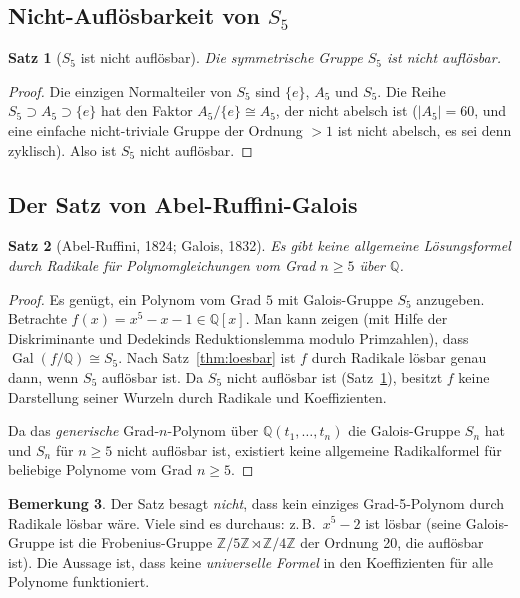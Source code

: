 \documentclass[12pt,a4paper]{amsart}
\newtheorem{theorem}{Satz}[section]
\theoremstyle{definition}
\newtheorem{bemerkung}[theorem]{Bemerkung}
\newcommand{\Q}{\mathbb{Q}}
\newcommand{\Z}{\mathbb{Z}}
\newcommand{\Gal}{\operatorname{Gal}}
\begin{document}
\subsection{Nicht-Auflösbarkeit von $S_5$}

\begin{theorem}[$S_5$ ist nicht auflösbar]
\label{thm:s5nichtloesbar}
Die symmetrische Gruppe $S_5$ ist nicht auflösbar.
\end{theorem}

\begin{proof}
Die einzigen Normalteiler von $S_5$ sind $\{e\}$, $A_5$ und $S_5$. Die Reihe
$S_5 \supset A_5 \supset \{e\}$ hat den Faktor $A_5/\{e\} \cong A_5$, der
nicht abelsch ist ($|A_5| = 60$, und eine einfache nicht-triviale Gruppe
der Ordnung $> 1$ ist nicht abelsch, es sei denn zyklisch). Also ist $S_5$
nicht auflösbar.
\end{proof}

\subsection{Der Satz von Abel-Ruffini-Galois}

\begin{theorem}[Abel-Ruffini, 1824; Galois, 1832]
\label{thm:abelruffini}
Es gibt keine allgemeine Lösungsformel durch Radikale für Polynomgleichungen
vom Grad $n \geq 5$ über $\Q$.
\end{theorem}

\begin{proof}
Es genügt, ein Polynom vom Grad $5$ mit Galois-Gruppe $S_5$ anzugeben.
Betrachte $f(x) = x^5 - x - 1 \in \Q[x]$. Man kann zeigen (mit Hilfe der
Diskriminante und Dedekinds Reduktionslemma modulo Primzahlen), dass
$\Gal(f/\Q) \cong S_5$. Nach Satz~\ref{thm:loesbar} ist $f$ durch Radikale
lösbar genau dann, wenn $S_5$ auflösbar ist. Da $S_5$ nicht auflösbar ist
(Satz~\ref{thm:s5nichtloesbar}), besitzt $f$ keine Darstellung seiner Wurzeln
durch Radikale und Koeffizienten.

Da das \emph{generische} Grad-$n$-Polynom über $\Q(t_1,\dots,t_n)$ die
Galois-Gruppe $S_n$ hat und $S_n$ für $n \geq 5$ nicht auflösbar ist,
existiert keine allgemeine Radikalformel für beliebige Polynome vom Grad
$n \geq 5$.
\end{proof}

\begin{bemerkung}
Der Satz besagt \emph{nicht}, dass kein einziges Grad-5-Polynom durch
Radikale lösbar wäre. Viele sind es durchaus: z.\,B.\ $x^5 - 2$ ist lösbar
(seine Galois-Gruppe ist die Frobenius-Gruppe $\Z/5\Z \rtimes \Z/4\Z$ der
Ordnung 20, die auflösbar ist). Die Aussage ist, dass keine
\emph{universelle Formel} in den Koeffizienten für alle Polynome funktioniert.
\end{bemerkung}
\end{document}
